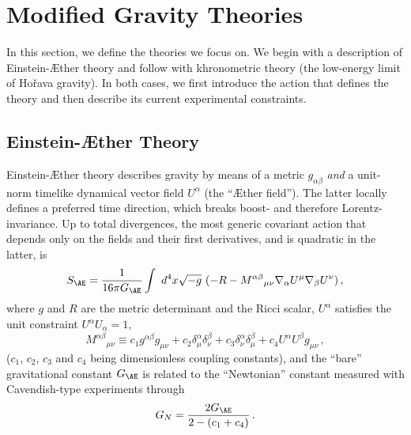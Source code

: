 \documentclass[prd,aps,twocolumn,nofootinbib,showpacs,superscriptaddress]{revtex4-1}
\newcommand\be{\begin{equation}}
\newcommand\ee{\end{equation}}
\def\a{\alpha}
\def\b{\beta}
\def\m{\mu}
\def\n{\nu}
\def\d{\delta}
\begin{document}
\section{Modified Gravity Theories}
\label{sec:MGT}

In this section, we define the theories we focus on. We begin with a
description of Einstein-\AE ther theory and follow with khronometric
theory (the low-energy limit of Ho\v rava gravity).  In both cases, we
first introduce the action that defines the theory and then describe
its current experimental constraints. 

\subsection{Einstein-\AE ther Theory}

Einstein-\AE ther theory describes
gravity by means of a metric $g_{\alpha \beta}$  \textit{and} a
unit-norm timelike dynamical vector field $U^{\alpha}$ (the ``\AE ther field''). The latter  locally defines a preferred time direction,
which breaks  boost- and therefore Lorentz-invariance.
Up to total divergences, the
most generic covariant action that depends only on the fields and their
first derivatives, and is quadratic in the latter, is~\cite{Jacobson:2000xp,Eling:2004dk,Jacobson:2008aj}
\be 
\label{ae-action} S_{\AE} = \frac{1}{16\pi G_{\AE}}\int  ~d^{4}x \sqrt{-g}~ (-R
-M^{\a\b}{}_{\m\n} \nabla_\a U^\m \nabla_\b U^\n)\,,
\ee 
where $g$ and $R$ are the metric determinant and the Ricci scalar,
$U^{\alpha}$ satisfies the unit constraint $U^{\alpha} U_{\alpha}=1$, 
\be
M^{\a\b}{}_{\m\n} \equiv c_1 g^{\a\b}g_{\m\n}+c_2\d^{\a}_{\m}\d^{\b}_{\n}
+c_3 \d^{\a}_{\n}\d^{\b}_{\m}+c_4 U^\a U^\b g_{\m\n}\, ,
\ee 
($c_1$,
$c_2$, $c_3$ and $c_4$ being dimensionless coupling constants), and the
``bare'' gravitational constant $G_{\AE}$ is related to the
``Newtonian'' constant measured with Cavendish-type experiments
through~\cite{Carroll:2004ai} 
\be 
\label{eq:GN}
G_N=\frac{2 G_{\AE}}{2-(c_1+c_4)}\,.
\ee  
\end{document}
